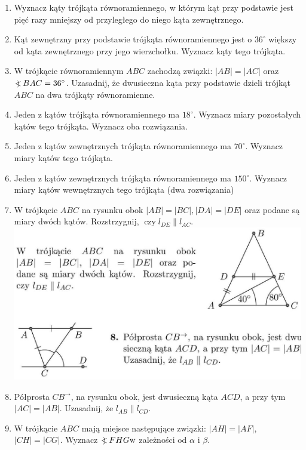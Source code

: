 \documentclass[10pt]{article}
\newcommand\Varangle{\mathop{{<\!\!\!\!\!\text{\small)}}\:}\nolimits}
\begin{document}
\begin{enumerate}
  \item Wyznacz kąty trójkąta równoramiennego, w którym kąt przy podstawie jest pięć razy mniejszy od przyległego do niego kąta zewnętrznego.
  \item Kąt zewnętrzny przy podstawie trójkąta równoramiennego jest o \(36^{\circ}\) większy od kąta zewnętrznego przy jego wierzchołku. Wyznacz kąty tego trójkąta.
  \item W trójkącie równoramiennym \(A B C\) zachodzą związki: \(|A B|=|A C|\) oraz \(\Varangle B A C=36^{\circ}\). Uzasadnij, że dwusieczna kąta przy podstawie dzieli trójkąt \(A B C\) na dwa trójkąty równoramienne.
  \item Jeden z kątów trójkąta równoramiennego ma \(18^{\circ}\). Wyznacz miary pozostałych kątów tego trójkąta. Wyznacz oba rozwiązania.
  \item Jeden z kątów zewnętrznych trójkąta równoramiennego ma \(70^{\circ}\). Wyznacz miary kątów tego trójkąta.
  \item Jeden z kątów zewnętrznych trójkąta równoramiennego ma \(150^{\circ}\). Wyznacz miary kątów wewnętrznych tego trójkąta (dwa rozwiązania)
  \item W trójkącie \(A B C\) na rysunku obok \(|A B|=|B C|,|D A|=|D E|\) oraz podane są miary dwóch kątów. Rozstrzygnij, \(\operatorname{czy} l_{D E} \| l_{A C}\).\\
\includegraphics[max width=\textwidth, center]{2024_11_21_71f62bd117d375398909g-170(1)}
  \item Półprosta \(C B^{\rightarrow}\), na rysunku obok, jest dwusieczną kąta \(A C D\), a przy tym \(|A C|=|A B|\). Uzasadnij, że \(l_{A B} \| l_{C D}\).
  \item W trójkącie \(A B C\) mają miejsce następujące związki: \(|A H|=|A F|\), \(|C H|=|C G|\). Wyznacz \(\Varangle F H G \mathrm{w}\) zależności od \(\alpha\) i \(\beta\).\\

\end{enumerate}
\end{document}
